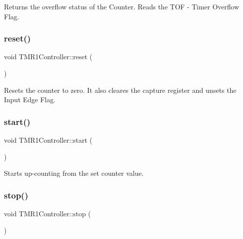 Returns the overflow status of the Counter. Reads the T\+OF -\/ Timer Overflow Flag. 

\mbox{\label{classTMR1Controller_adf3746ffd24c5b55abff4fa18e05f6b3}} 
\subsubsection{\texorpdfstring{reset()}{reset()}}
{\footnotesize\ttfamily void T\+M\+R1\+Controller\+::reset (\begin{DoxyParamCaption}{ }\end{DoxyParamCaption})\hspace{0.3cm}{\ttfamily [inline]}}



Resets the counter to zero. It also cleares the capture register and unsets the Input Edge Flag. 

\mbox{\label{classTMR1Controller_a67bc04f0648176a681f6ac01ea483db9}} 
\subsubsection{\texorpdfstring{start()}{start()}}
{\footnotesize\ttfamily void T\+M\+R1\+Controller\+::start (\begin{DoxyParamCaption}{ }\end{DoxyParamCaption})\hspace{0.3cm}{\ttfamily [inline]}}



Starts up-\/counting from the set counter value. 

\mbox{\label{classTMR1Controller_afcb0ea27107bfbe50b9dcbd54207dd00}} 
\subsubsection{\texorpdfstring{stop()}{stop()}}
{\footnotesize\ttfamily void T\+M\+R1\+Controller\+::stop (\begin{DoxyParamCaption}{ }\end{DoxyParamCaption})\hspace{0.3cm}{\ttfamily [inline]}}



